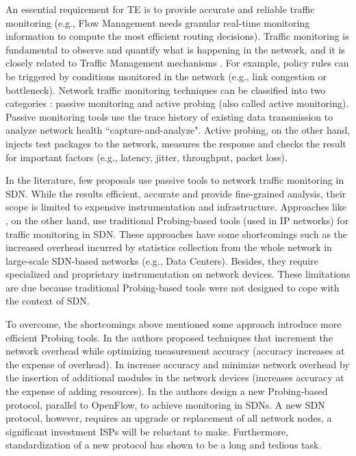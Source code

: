 An essential requirement for TE is to provide accurate and reliable traffic monitoring (e.g., Flow Management needs granular real-time monitoring information to compute the most efficient routing decisions). Traffic monitoring is fundamental to observe and quantify what is happening in the network, and it is closely related to Traffic Management mechanisms \cite{tangari_2017:decentralized_monitoring, machado_2014:towards_SLA_Policy}. For example, policy rules can be triggered by conditions monitored in the network (e.g., link congestion or bottleneck). Network traffic monitoring techniques can be classified into two categories \cite{mohan2011:active_passive,Ningning_2003:probing_techniques}: passive monitoring and active probing (also called active monitoring). Passive monitoring tools use the trace history of existing data transmission to analyze network health ``capture-and-analyze". Active probing, on the other hand, injects test packages to the network, measures the response and checks the result for important factors (e.g., latency, jitter, throughput, packet loss).

In the literature, few proposals \cite{suh_2014:OpenSample,Yu_2013:flow_sense} use passive tools to network traffic monitoring in SDN. While the results efficient, accurate and provide fine-grained analysis, their scope is limited to expensive instrumentation and infrastructure. Approaches like \cite{bandi_2007:JFlow, Sflow_2003:sflow, Cisco_2012:netflow}, on the other hand, use traditional Probing-based tools (used in IP networks) for traffic monitoring in SDN. These approaches have some shortcomings such as the increased overhead incurred by statistics collection from the whole network in large-scale SDN-based networks (e.g., Data Centers). Besides, they require specialized and proprietary instrumentation on network devices. These limitations are due because traditional Probing-based tools were not designed to cope with the context of SDN.

To overcome, the shortcomings above mentioned some approach \cite{chowdhury_2014:payless,raumer_2014:monsamp, van_2014:OpenNetMon,Tootoonchian_2010:opentm,Sun_2015:HONE,Dusi_2014:reactive_sdn, jose_2011:online, minlan_2013:OpenSketch} introduce more efficient Probing tools. In \cite{chowdhury_2014:payless,raumer_2014:monsamp,van_2014:OpenNetMon,Tootoonchian_2010:opentm} the authors proposed techniques that increment the network overhead while optimizing measurement accuracy (accuracy increases at the expense of overhead). In \cite{Sun_2015:HONE, Dusi_2014:reactive_sdn,jose_2011:online} increase accuracy and minimize network overhead by the insertion of additional modules in the network devices (increases accuracy at the expense of adding resources). In \cite{minlan_2013:OpenSketch} the authors design a new Probing-based protocol, parallel to OpenFlow, to achieve monitoring in SDNs. A new SDN protocol, however, requires an upgrade or replacement of all network nodes, a significant investment ISPs will be reluctant to make. Furthermore, standardization of a new protocol has shown to be a long and tedious task. 

